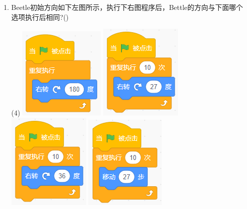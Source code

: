 \documentclass[10pt, a4paper]{article}
\begin{document}
\begin{enumerate}
        \item Beetle初始方向如下左图所示，执行下右图程序后，Bettle的方向与下面哪个选项执行后相同?(\qquad)
        \begin{tasks}(4)
            \task \includegraphics[width=.13\textwidth]{8a.png}
            \task \includegraphics[width=.12\textwidth]{8b.png}
            \task \includegraphics[width=.12\textwidth]{8c.png}
            \task \includegraphics[width=.12\textwidth]{8d.png}
        \end{tasks}


\end{enumerate}
\end{document}
